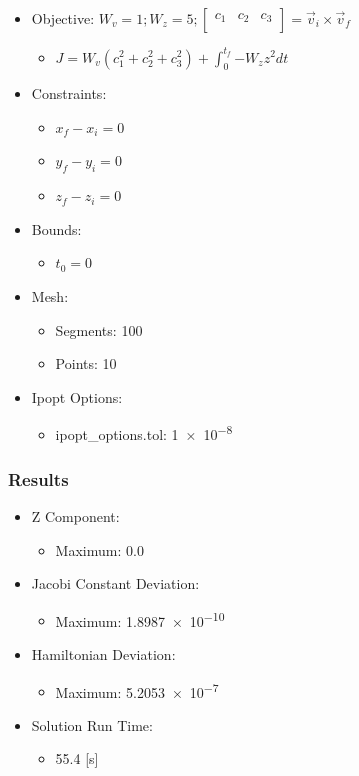 \documentclass{article}
\begin{document}
\begin{itemize}
    \item Objective: $W_v = 1; W_z = 5; \left[\begin{matrix}c_1&c_2&c_3\\\end{matrix}\right] = \vec{v}_i\times\vec{v}_f$
    \begin{itemize}
        \item $J = W_v\left(c_1^2 + c_2^2 + c_3^2\right) + \int_{0}^{t_f}{-W_zz^2dt}$
    \end{itemize}
    \item Constraints:
    \begin{itemize}
        \item $x_f - x_i = 0$
        \item $y_f - y_i = 0$
        \item $z_f - z_i = 0$
    \end{itemize}
    \item Bounds:
    \begin{itemize}
        \item $t_0 = 0$
    \end{itemize}
    \item Mesh:
    \begin{itemize}
        \item Segments: 100
        \item Points: 10
    \end{itemize}
    \item Ipopt Options:
    \begin{itemize}
        \item ipopt\_options.tol: \num{1e-8}
    \end{itemize}
\end{itemize}

\subsubsection{Results}

\begin{itemize}
    \item Z Component:
    \begin{itemize}
        \item Maximum: 0.0
    \end{itemize}
    \item Jacobi Constant Deviation:
    \begin{itemize}
        \item Maximum: \num{1.8987e-10}
    \end{itemize}
    \item Hamiltonian Deviation:
    \begin{itemize}
        \item Maximum: \num{5.2053e-7}
    \end{itemize}
    \item Solution Run Time:
    \begin{itemize}
        \item 55.4 [s]
    \end{itemize}  
\end{itemize}
\end{document}
